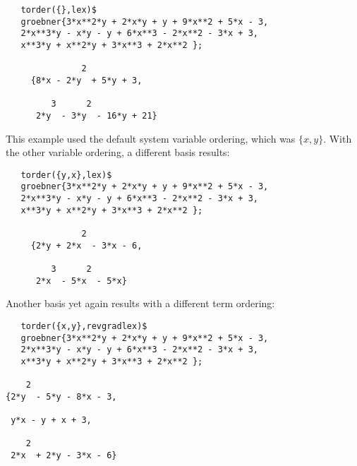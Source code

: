 \example {}
\begin{verbatim}
   torder({},lex)$
   groebner{3*x**2*y + 2*x*y + y + 9*x**2 + 5*x - 3,
   2*x**3*y - x*y - y + 6*x**3 - 2*x**2 - 3*x + 3,
   x**3*y + x**2*y + 3*x**3 + 2*x**2 };

               2
     {8*x - 2*y  + 5*y + 3,

         3      2
      2*y  - 3*y  - 16*y + 21}
\end{verbatim}


This example used the default system variable ordering, which was
$\{x,y\}$. With the other variable ordering, a different basis results:

\begin{verbatim}
   torder({y,x},lex)$
   groebner{3*x**2*y + 2*x*y + y + 9*x**2 + 5*x - 3,
   2*x**3*y - x*y - y + 6*x**3 - 2*x**2 - 3*x + 3,
   x**3*y + x**2*y + 3*x**3 + 2*x**2 };

               2
     {2*y + 2*x  - 3*x - 6,

         3      2
      2*x  - 5*x  - 5*x}
\end{verbatim}


Another basis yet again results with a different term ordering:
\begin{verbatim}
   torder({x,y},revgradlex)$
   groebner{3*x**2*y + 2*x*y + y + 9*x**2 + 5*x - 3,
   2*x**3*y - x*y - y + 6*x**3 - 2*x**2 - 3*x + 3,
   x**3*y + x**2*y + 3*x**3 + 2*x**2 };

    2
{2*y  - 5*y - 8*x - 3,

 y*x - y + x + 3,

    2
 2*x  + 2*y - 3*x - 6}
\end{verbatim}


